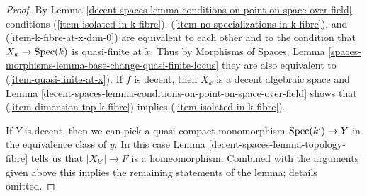 \begin{proof}
By Lemma \ref{decent-spaces-lemma-conditions-on-point-on-space-over-field} conditions
(\ref{item-isolated-in-k-fibre}),
(\ref{item-no-specializations-in-k-fibre}), and (\ref{item-k-fibre-at-x-dim-0})
are equivalent to each other and to the condition that
$X_k \to \operatorname{Spec}(k)$ is quasi-finite at $\tilde x$.
Thus by Morphisms of Spaces, Lemma
\ref{spaces-morphisms-lemma-base-change-quasi-finite-locus}
they are also equivalent to (\ref{item-quasi-finite-at-x}).
If $f$ is decent, then $X_k$ is a decent algebraic space and
Lemma \ref{decent-spaces-lemma-conditions-on-point-on-space-over-field}
shows that (\ref{item-dimension-top-k-fibre}) implies
(\ref{item-isolated-in-k-fibre}).

\medskip\noindent
If $Y$ is decent, then we can pick a quasi-compact monomorphism
$\operatorname{Spec}(k') \to Y$ in the equivalence class of $y$. In this case
Lemma \ref{decent-spaces-lemma-topology-fibre}
tells us that $|X_{k'}| \to F$ is a homeomorphism.
Combined with the arguments given above this implies
the remaining statements of the lemma; details omitted.
\end{proof}

